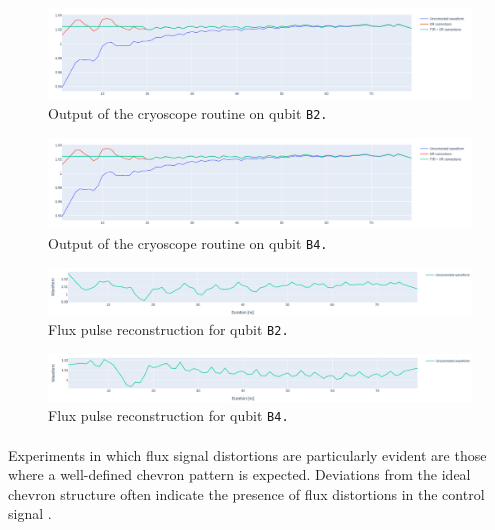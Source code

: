 \begin{figure}[h!]
    \centering
    \includegraphics[width=\textwidth]{figures/png/Cryoscope/B2_ringing.png}
    \caption{Output of the cryoscope routine on qubit \tt{B2}.}
    \label{fig:cryoscope:B2}
\end{figure}

\begin{figure}[h!]
    \centering
    \includegraphics[width=\textwidth]{figures/png/Cryoscope/B2_ringing.png}
    \caption{Output of the cryoscope routine on qubit \tt{B4}.}
    \label{fig:cryoscope:B4}
\end{figure} 

\begin{figure}[h!]
    \centering
    \includegraphics[width=\textwidth]{figures/png/Cryoscope/flux_B2.png}
    \caption{Flux pulse reconstruction for qubit \tt{B2}.}
    \label{fig:flux:B2}
\end{figure}

\begin{figure}[h!]
    \centering
    \includegraphics[width=\textwidth]{figures/png/Cryoscope/flux_B4.png}
    \caption{Flux pulse reconstruction for qubit \tt{B4}.}
    \label{fig:flux:B4}
\end{figure} 

\paragraph{}
Experiments in which flux signal distortions are particularly evident are those where a well-defined chevron pattern is expected. Deviations from the ideal chevron structure often indicate the presence of flux distortions in the control signal \cite{Langford2017}.

